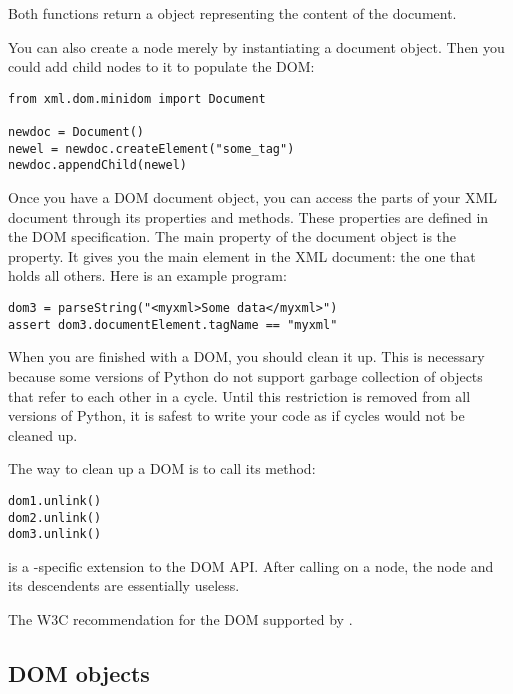 Both functions return a  object representing the
content of the document.

You can also create a  node merely by instantiating a 
document object.  Then you could add child nodes to it to populate
the DOM:

\begin{verbatim}
from xml.dom.minidom import Document

newdoc = Document()
newel = newdoc.createElement("some_tag")
newdoc.appendChild(newel)
\end{verbatim}

Once you have a DOM document object, you can access the parts of your
XML document through its properties and methods.  These properties are
defined in the DOM specification.  The main property of the document
object is the  property.  It gives you the
main element in the XML document: the one that holds all others.  Here
is an example program:

\begin{verbatim}
dom3 = parseString("<myxml>Some data</myxml>")
assert dom3.documentElement.tagName == "myxml"
\end{verbatim}

When you are finished with a DOM, you should clean it up.  This is
necessary because some versions of Python do not support garbage
collection of objects that refer to each other in a cycle.  Until this
restriction is removed from all versions of Python, it is safest to
write your code as if cycles would not be cleaned up.

The way to clean up a DOM is to call its  method:

\begin{verbatim}
dom1.unlink()
dom2.unlink()
dom3.unlink()
\end{verbatim}

 is a -specific extension to
the DOM API.  After calling  on a node, the node and
its descendents are essentially useless.

\begin{seealso}
           {The W3C recommendation for the
            DOM supported by .}
\end{seealso}


\subsection{DOM objects \label{dom-objects}}

